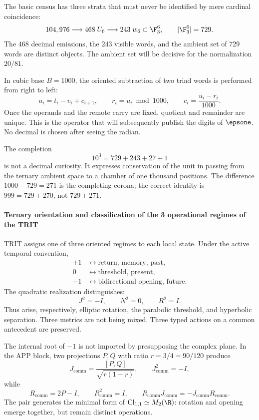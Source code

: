 The basic census has three strata that must never be identified by mere cardinal coincidence:
\[
104,976\longrightarrow468\;U_6\longrightarrow243\;w_6
\subset\F_3^6,\qquad |\F_3^6|=729.
\]
The \(468\) decimal emissions, the \(243\) visible words, and the ambient set
of \(729\) words are distinct objects. The ambient set will be decisive for the
normalization \(20/81\).

In cubic base \(B=1000\), the oriented subtraction of two triad words is
performed from right to left:
\begin{equation}
u_i=t_i-v_i+c_{i+1},\qquad
r_i=u_i\bmod1000,\qquad
c_i=\frac{u_i-r_i}{1000}.
\label{eq:subacarreo}
\end{equation}
Once the operands and the remote carry are fixed, quotient and remainder are unique. This is
the operator that will subsequently publish the digits of \(\epsone\). No
decimal is chosen after seeing the radian.

The completion
\[
10^3=729+243+27+1
\]
is not a decimal curiosity. It expresses conservation of the unit in passing
from the ternary ambient space to a chamber of one thousand positions. The difference
\(1000-729=271\) is the completing corona; the correct identity is
\(999=729+270\), not \(729+271\).

\paragraph{Ternary orientation and classification of the 3 operational regimes of the TRIT}

TRIT assigns one of three oriented regimes to each local state. Under the
active temporal convention,
\[
\begin{aligned}
+1&\longleftrightarrow\text{return, memory, past},\\
0&\longleftrightarrow\text{threshold, present},\\
-1&\longleftrightarrow\text{bidirectional opening, future}.
\end{aligned}
\]
The quadratic realization distinguishes:
\begin{equation}
J^2=-I,\qquad N^2=0,\qquad R^2=I.
\label{eq:tres-regimenes}
\end{equation}
Thus arise, respectively, elliptic rotation, the parabolic threshold, and
hyperbolic separation. Three metrics are not being mixed. Three typed
actions on a common antecedent are preserved.

The internal root of \(-1\) is not imported by presupposing the complex
plane. In the APP block, two projections \(P,Q\) with ratio
\(r=3/4=90/120\) produce
\[
J_{\mathrm{comm}}=\frac{[P,Q]}{\sqrt{r(1-r)}},\qquad J_{\mathrm{comm}}^2=-I,
\]
while
\[
R_{\mathrm{comm}}=2P-I,\qquad R_{\mathrm{comm}}^2=I,\qquad
R_{\mathrm{comm}}J_{\mathrm{comm}}=-J_{\mathrm{comm}}R_{\mathrm{comm}}.
\]
The pair generates the minimal form of \(\mathrm{Cl}_{1,1}\simeq M_2(\R)\):
rotation and opening emerge together, but remain distinct operations.


